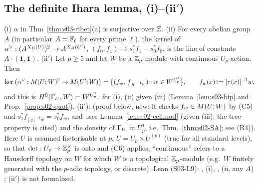 \subsection*{The definite Ihara lemma, (i)--(ii$'$)}

\begin{corollary}\label{cor:s03-ihara}
(i) $\alpha$ in Thm~\ref{thm:s03-ribet}(a) is surjective over $\mathbb{Z}$.
(ii) For every abelian group $A$ (in particular $A=\mathbb{F}_\ell$ for every prime $\ell$), the kernel of
$\alpha^\vee:(A^{X_B(U)})^2\to A^{X_B(U')}$, $(f_0,f_1)\mapsto s_1^*f_1-s_0^*f_0$, is the line of constants $A\cdot(\mathbf1,\mathbf1)$.
(ii$'$) Let $p\ge5$ and let $W$ be a $\mathbb{Z}_p$-module with continuous $U_p$-action. Then
\[\ker\big(\alpha^\vee:M(U;W)^2\to M(U';W)\big)=\big\{(f_w,\,f_{[q]^{-1}w}):w\in W^{U^1_p}\big\},\qquad f_w(x):=[\tau(x)]^{-1}w,\]
and this is $H^0(\Gamma_U,W)=W^{U^1_p}$.
\stproved{} for (i), (ii) given (iii) (Lemma~\ref{lem:s03-bip} and Prop.~\ref{prop:s02-quot}). (ii$'$): \stpmc{} (proof below, new: it checks
$f_w\in M(U;W)$ by (C5) and $s_1^*f_{[q]^{-1}w}=s_0^*f_w$, and uses Lemma~\ref{lem:s02-cellmod} (given (iii); the tree property is cited)
and the density of $\Gamma_U$ in $U^1_p$, i.e.\ Thm.~\ref{thm:s02-SA}; see (R4)). Here $U$ is assumed factorisable at $p$, $U=U_p\times U^{(p)}$ (true
for all standard levels), so that $\det:U_p\to\mathbb{Z}_p^\times$ is onto and (C6) applies; ``continuous'' refers to a Hausdorff topology on $W$ for which
$W$ is a topological $\mathbb{Z}_p$-module (e.g.\ $W$ finitely generated with the $p$-adic topology, or discrete). Lean (S03-L9): ,  (i), ,  (ii, any $A$) \stformal{}; (ii$'$) is not formalized.
\end{corollary}
